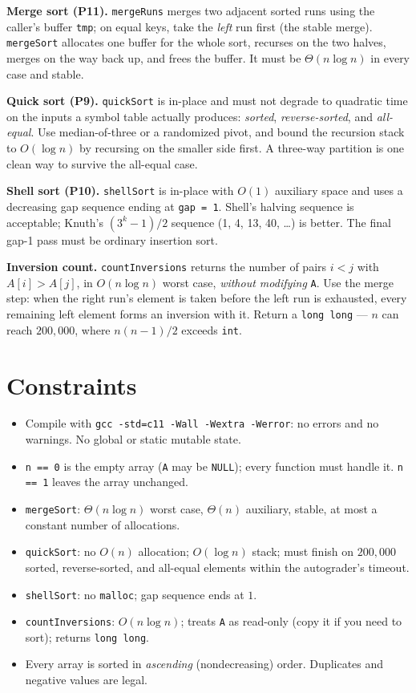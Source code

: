 \documentclass[11pt]{article}
\begin{document}
\textbf{Merge sort (P11).} \texttt{mergeRuns} merges two adjacent sorted runs using the caller's buffer \texttt{tmp}; on equal keys, take the \emph{left} run first (the stable merge). \texttt{mergeSort} allocates one buffer for the whole sort, recurses on the two halves, merges on the way back up, and frees the buffer. It must be $\Theta(n\log n)$ in every case and stable.

\textbf{Quick sort (P9).} \texttt{quickSort} is in-place and must not degrade to quadratic time on the inputs a symbol table actually produces: \emph{sorted}, \emph{reverse-sorted}, and \emph{all-equal}. Use median-of-three or a randomized pivot, and bound the recursion stack to $O(\log n)$ by recursing on the smaller side first. A three-way partition is one clean way to survive the all-equal case.

\textbf{Shell sort (P10).} \texttt{shellSort} is in-place with $O(1)$ auxiliary space and uses a decreasing gap sequence ending at \texttt{gap = 1}. Shell's halving sequence is acceptable; Knuth's $(3^k-1)/2$ sequence (1, 4, 13, 40, \dots) is better. The final gap-1 pass must be ordinary insertion sort.

\textbf{Inversion count.} \texttt{countInversions} returns the number of pairs $i<j$ with $A[i]>A[j]$, in $O(n\log n)$ worst case, \emph{without modifying} \texttt{A}. Use the merge step: when the right run's element is taken before the left run is exhausted, every remaining left element forms an inversion with it. Return a \texttt{long long} --- $n$ can reach $200{,}000$, where $n(n-1)/2$ exceeds \texttt{int}.

\section{Constraints}

\begin{itemize}
  \item Compile with \texttt{gcc -std=c11 -Wall -Wextra -Werror}: no errors and no warnings. No global or static mutable state.
  \item \texttt{n == 0} is the empty array (\texttt{A} may be \texttt{NULL}); every function must handle it. \texttt{n == 1} leaves the array unchanged.
  \item \texttt{mergeSort}: $\Theta(n\log n)$ worst case, $\Theta(n)$ auxiliary, stable, at most a constant number of allocations.
  \item \texttt{quickSort}: no $O(n)$ allocation; $O(\log n)$ stack; must finish on $200{,}000$ sorted, reverse-sorted, and all-equal elements within the autograder's timeout.
  \item \texttt{shellSort}: no \texttt{malloc}; gap sequence ends at $1$.
  \item \texttt{countInversions}: $O(n\log n)$; treats \texttt{A} as read-only (copy it if you need to sort); returns \texttt{long long}.
  \item Every array is sorted in \emph{ascending} (nondecreasing) order. Duplicates and negative values are legal.
\end{itemize}
\end{document}
